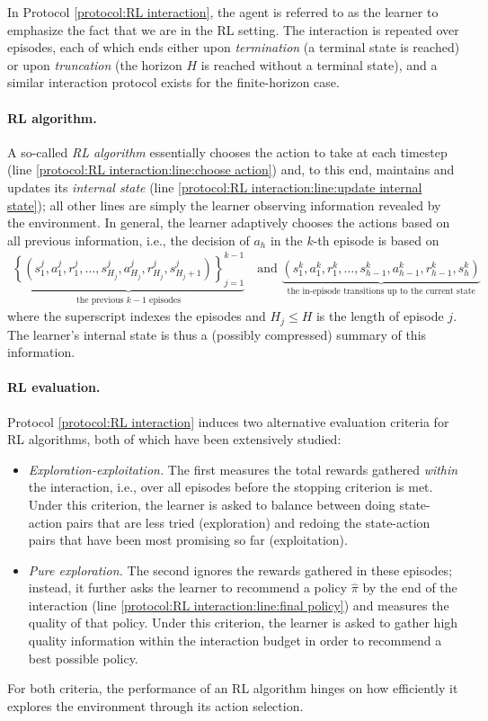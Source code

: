 In Protocol \ref{protocol:RL interaction}, the agent is referred to as the learner to emphasize the fact that we are in the RL setting.
The interaction is repeated over episodes, each of which ends either upon {\em termination} (a terminal state is reached) or upon {\em truncation} (the horizon $H$ is reached without a terminal state), and a similar interaction protocol exists for the finite-horizon case.

\paragraph{RL algorithm.}
A so-called {\em RL algorithm} essentially chooses the action to take at each timestep (line \ref{protocol:RL interaction:line:choose action}) and, to this end, maintains and updates its {\em internal state} (line \ref{protocol:RL interaction:line:update internal state});
all other lines are simply the learner observing information revealed by the environment.
In general, the learner adaptively chooses the actions based on all previous information, i.e., the decision of $a_h$ in the $k$-th episode is based on
\begin{align*}
    \underbrace{\left\{(s^j_1,a^j_1,r^j_1,\ldots,s^j_{H_j},a^j_{H_j},r^j_{H_j},s^j_{H_j+1})\right\}_{j=1}^{k-1}}_{\text{the previous $k-1$ episodes}}
    \quad \text{and } \underbrace{(s^k_1,a^k_1,r^k_1,\ldots,s^k_{h-1},a^k_{h-1},r^k_{h-1}, s^k_h)}_{\text{the in-episode transitions up to the current state}}
\end{align*}
where the superscript indexes the episodes and $H_j\leq H$ is the length of episode $j$.
The learner's internal state is thus a (possibly compressed) summary of this information.

\paragraph{RL evaluation.}
Protocol \ref{protocol:RL interaction} induces two alternative evaluation criteria for RL algorithms, both of which have been extensively studied:
\begin{itemize}
    \item {\em Exploration-exploitation.}
    The first measures the total rewards gathered {\em within} the interaction, i.e., over all episodes before the stopping criterion is met.
    Under this criterion, the learner is asked to balance between doing state-action pairs that are less tried (exploration) and redoing the state-action pairs that have been most promising so far (exploitation).

    \item {\em Pure exploration.}
    The second ignores the rewards gathered in these episodes; instead, it further asks the learner to recommend a policy $\widehat{\pi}$ by the end of the interaction (line \ref{protocol:RL interaction:line:final policy}) and measures the quality of that policy.
    Under this criterion, the learner is asked to gather high quality information within the interaction budget in order to recommend a best possible policy. 
\end{itemize}
For both criteria, the performance of an RL algorithm hinges on how efficiently it explores the environment through its action selection.

